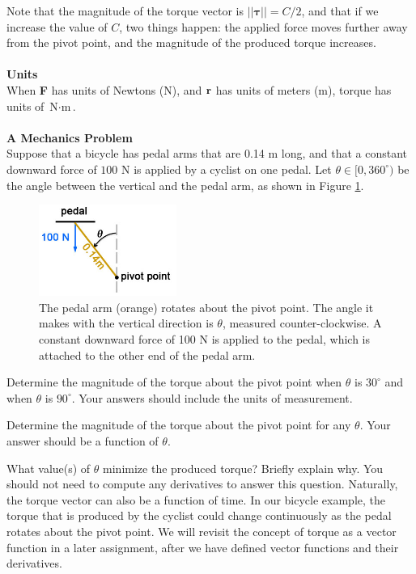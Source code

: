 Note that the magnitude of the torque vector is $||\boldsymbol\tau|| = C/2$, and that if we increase the value of $C$, two things happen: the applied force moves further away from the pivot point, and the magnitude of the produced torque increases. \\\\
\textbf{Units}\\
When \textbf{F} has units of Newtons (N), and $\mathbf{r}$ has units of meters (m), torque has units of $\text{N}\cdot\text{m}$.\\\\
\textbf{A Mechanics Problem}\\
Suppose that a bicycle has pedal arms that are 0.14 m long, and that a constant downward force of $100 \text{ N}$ is applied by a cyclist on one pedal.  Let $\theta \in [0,360^{\circ})$ be the angle between the vertical and the pedal arm, as shown in Figure \ref{FigCycle}. 
\begin{figure}[H]
  \begin{center}
    \includegraphics[width=0.4\textwidth]{ImgBicycle.jpg}
      \caption{\small{The pedal arm (orange) rotates about the pivot point. The angle it makes with the vertical direction is $\theta$, measured counter-clockwise. A constant downward force of 100 N is applied to the pedal, which is attached to the other end of the pedal arm.\label{FigCycle} }}
  \end{center}
\end{figure}
\BEN
  \item Determine the magnitude of the torque about the pivot point when $\theta$ is $30^{\circ}$ and when $\theta$ is $90^{\circ}$. Your answers should include the units of measurement. 
  \item Determine the magnitude of the torque about the pivot point for any $\theta$. Your answer should be a function of $\theta$.  
  \item What value(s) of $\theta$ minimize the produced torque? Briefly explain why. You should not need to compute any derivatives to answer this question. 
\EEN
Naturally, the torque vector can also be a function of time. In our bicycle example, the torque that is produced by the cyclist could change continuously as the pedal rotates about the pivot point. We will revisit the concept of torque as a vector function in a later assignment, after we have defined vector functions and their derivatives. 

